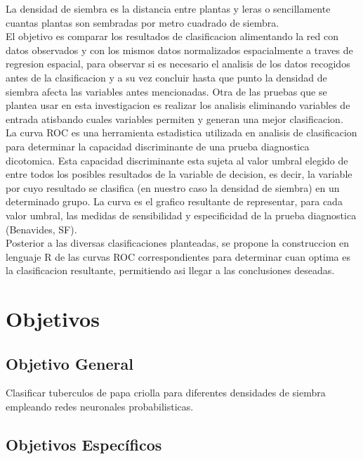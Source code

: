 La densidad de siembra es la distancia entre plantas y leras o sencillamente cuantas plantas son sembradas por metro cuadrado de siembra.\\

El objetivo es comparar los resultados de clasificacion alimentando la red con datos observados y con los mismos datos normalizados espacialmente a traves de regresion espacial, para observar si es necesario el analisis de los datos recogidos antes de la clasificacion y a su vez concluir hasta que punto la densidad de siembra afecta las variables antes mencionadas. Otra de las pruebas que se plantea usar en esta investigacion es realizar los analisis eliminando variables de entrada atisbando cuales variables permiten y generan una mejor clasificacion.\\

La curva ROC es una herramienta estadistica utilizada en analisis de clasificacion para determinar la capacidad discriminante de una prueba diagnostica dicotomica. Esta capacidad discriminante esta sujeta al valor umbral elegido de entre todos los posibles resultados de la variable de decision, es decir, la variable por cuyo resultado se clasifica (en nuestro caso la densidad de siembra) en un determinado grupo. La curva es el grafico resultante de representar, para cada valor umbral, las medidas de sensibilidad y especificidad de la prueba diagnostica (Benavides, SF).\\

Posterior a las diversas clasificaciones planteadas, se propone la construccion en lenguaje R de las curvas ROC correspondientes para determinar cuan optima es la clasificacion resultante, permitiendo asi llegar a las conclusiones deseadas. 

\section{Objetivos}

\subsection{Objetivo General}

Clasificar tuberculos de papa criolla para diferentes densidades de siembra empleando redes neuronales probabilisticas.

\subsection{Objetivos Espec\'ificos}
 
